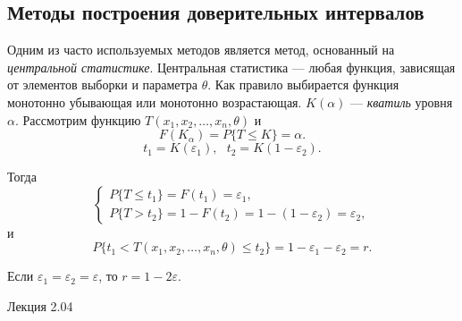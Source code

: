 \documentclass[12pt]{article}
\begin{document}
\subsection{Методы построения доверительных интервалов}
Одним из часто используемых методов является метод, основанный на \emph{центральной статистике}. Центральная статистика --- любая функция, зависящая от элементов выборки и параметра $\theta$. Как правило выбирается функция монотонно убывающая или монотонно возрастающая. $K(\alpha)$ --- \emph{кватиль} уровня $\alpha$. Рассмотрим функцию $T(x_1, x_2, \ldots, x_n, \theta)$ и
\[ F(K_{\alpha})  = P \{ T \leq K \} = \alpha. \]
\[ t_1 = K(\varepsilon_1), ~~~ t_2 = K(1 - \varepsilon_2). \]

Тогда
\[
\begin{cases}
    P \{ T \leq t_1 \} = F(t_1) = \varepsilon_1,\\
    P \{ T > t_2 \} = 1 - F(t_2) = 1 - (1 - \varepsilon_2) = \varepsilon_2,
\end{cases}\]
и
\[ P \{ t_1 < T(x_1, x_2, \ldots, x_n, \theta) \leq t_2 \} = 1 - \varepsilon_1 - \varepsilon_2 = r. \]

Если $\varepsilon_1 = \varepsilon_2 = \varepsilon$, то $r = 1 - 2 \varepsilon$.

\begin{comment} 
Таким образом, верхняя и нижняя границы определяются из системы **.
Рассуждения аналогично повторяются для случая многопараметрической статистики.
Пример доверительного оценивания для нормального распределения (см картиночку).
Статистика T подобрана таким образом, чтобы быть связанной с нормальным распределением, при этом сама статистика T распределена нормально с параметрами 0,1. Статистика является монотонно убывающей по сигма. U альфа - квантиль уровня альфа для стандартного нормального закона распределения.
Таким образом, получается что центром доверительного интервала является выборочная величина xср, тогда полагая оценка Мю приблизительно равной xср можно построить систему для оценки сигмы нижняя, сигма верхняя, откуда можем оценить нижнюю и верхнюю границу сигмы верхнее подчеркивание и сигма нижнее подчеркивание. Отметим, что в найденный диапозон оцениваемый параметр попадает с заданной вероятностью гамма. Таким образом, подход вычислительно сложнее точечного оценивания, но включает оценку достоверности полученного результата.
https://vk.com/im?act=browse_images&id=564801
\end{comment} 


Лекция 2.04 
\newpage
\end{document}
